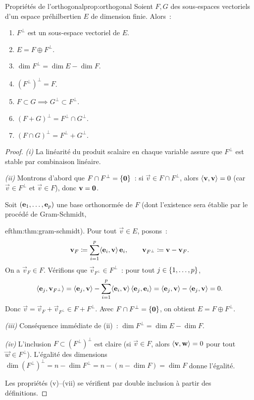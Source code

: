 \begin{proposition}{Propriétés de l'orthogonal}{prop:orthogonal}
  Soient $F,G$ des sous-espaces vectoriels d'un espace préhilbertien
  $E$ de dimension finie. Alors~:
  \begin{enumerate}[label=(\roman*)]
    \item $F^\perp$ est un sous-espace vectoriel de $E$.
    \item $E=F\oplus F^\perp$.
      \label{item:decomp-ortho}
    \item $\dim F^\perp=\dim E-\dim F$.
    \item $(F^\perp)^\perp=F$.
    \item $F\subset G\implies G^\perp\subset F^\perp$.
    \item $(F+G)^\perp=F^\perp\cap G^\perp$.
    \item $(F\cap G)^\perp=F^\perp+G^\perp$.
  \end{enumerate}
\end{proposition}

\begin{proof}
  \emph{(i)} La linéarité du produit scalaire en chaque variable assure
  que $F^\perp$ est stable par combinaison linéaire.

  \emph{(ii)} Montrons d'abord que $F\cap F^\perp=\left\{\mathbf{0}\right\}$~:
  si $\vec{v}\in F\cap F^\perp$, alors
  $\langle\mathbf{v},\mathbf{v}\rangle=0$ (car $\vec{v}\in F^\perp$ et
  $\vec{v}\in F$), donc $\mathbf{v}=\mathbf{0}$.

  Soit $(\mathbf{e}_{1},\ldots,\mathbf{e}_{p})$ une base orthonormée de $F$
  (dont l'existence sera établie par le procédé de Gram-Schmidt,
  
ef{thm:thm:gram-schmidt}). Pour tout $\vec{v}\in E$, posons~:
  \[
    \mathbf{v}_F\coloneqq\sum_{i=1}^p\langle\mathbf{e}_{i},\mathbf{v}\rangle\,\mathbf{e}_{i},
    \qquad
    \mathbf{v}_{F^\perp}\coloneqq\mathbf{v}-\mathbf{v}_F.
  \]
  On a $\vec{v}_F\in F$. Vérifions que $\vec{v}_{F^\perp}\in F^\perp$~:
  pour tout $j\in\left\{1,\ldots,p\right\}$,
  \[
    \langle\mathbf{e}_{j},\mathbf{v}_{F^\perp}\rangle
    =\langle\mathbf{e}_{j},\mathbf{v}\rangle
    -\sum_{i=1}^p\langle\mathbf{e}_{i},\mathbf{v}\rangle\,\langle\mathbf{e}_{j},\mathbf{e}_{i}\rangle
    =\langle\mathbf{e}_{j},\mathbf{v}\rangle-\langle\mathbf{e}_{j},\mathbf{v}\rangle=0.
  \]
  Donc $\vec{v}=\vec{v}_F+\vec{v}_{F^\perp}\in F+F^\perp$. Avec
  $F\cap F^\perp=\left\{\mathbf{0}\right\}$, on obtient $E=F\oplus F^\perp$.

  \emph{(iii)} Conséquence immédiate de (ii)~:
  $\dim F^\perp=\dim E-\dim F$.

  \emph{(iv)} L'inclusion $F\subset(F^\perp)^\perp$ est claire (si
  $\vec{v}\in F$, alors $\langle\mathbf{v},\mathbf{w}\rangle=0$ pour tout
  $\vec{w}\in F^\perp$). L'égalité des dimensions
  $\dim(F^\perp)^\perp=n-\dim F^\perp=n-(n-\dim F)=\dim F$ donne
  l'égalité.

  Les propriétés (v)--(vii) se vérifient par double inclusion à partir
  des définitions.
\end{proof}

